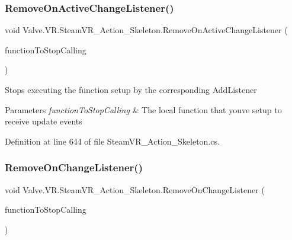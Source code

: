 \subsubsection{\texorpdfstring{RemoveOnActiveChangeListener()}{RemoveOnActiveChangeListener()}}
{\footnotesize\ttfamily void Valve.\+V\+R.\+Steam\+V\+R\+\_\+\+Action\+\_\+\+Skeleton.\+Remove\+On\+Active\+Change\+Listener (\begin{DoxyParamCaption}\item[{\mbox{\hyperlink{class_valve_1_1_v_r_1_1_steam_v_r___action___skeleton_ae329ff2582f41c7ec52ecdf3b34b345a}{Active\+Change\+Handler}}}]{function\+To\+Stop\+Calling }\end{DoxyParamCaption})}



Stops executing the function setup by the corresponding Add\+Listener 


\begin{DoxyParams}{Parameters}
{\em function\+To\+Stop\+Calling} & The local function that you\textquotesingle{}ve setup to receive update events\\
\hline
\end{DoxyParams}


Definition at line 644 of file Steam\+V\+R\+\_\+\+Action\+\_\+\+Skeleton.\+cs.

\mbox{\label{class_valve_1_1_v_r_1_1_steam_v_r___action___skeleton_a766a14c9618f04ba29f2b457fe29f59d}} 
\subsubsection{\texorpdfstring{RemoveOnChangeListener()}{RemoveOnChangeListener()}}
{\footnotesize\ttfamily void Valve.\+V\+R.\+Steam\+V\+R\+\_\+\+Action\+\_\+\+Skeleton.\+Remove\+On\+Change\+Listener (\begin{DoxyParamCaption}\item[{\mbox{\hyperlink{class_valve_1_1_v_r_1_1_steam_v_r___action___skeleton_a41a68545cb313ef9f47600d9e9022177}{Change\+Handler}}}]{function\+To\+Stop\+Calling }\end{DoxyParamCaption})}



